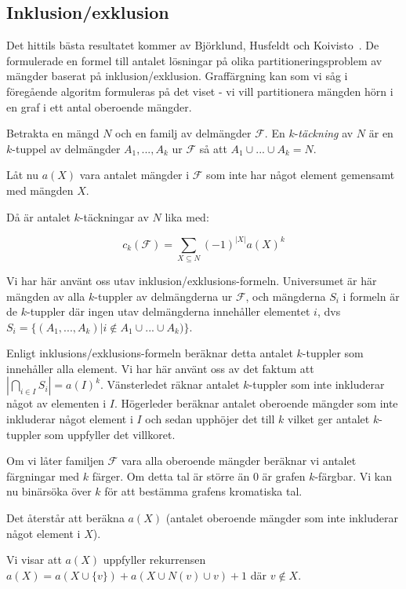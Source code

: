 \documentclass[a4paper]{report}
\begin{document}
\subsection{Inklusion/exklusion}

Det hittils bästa resultatet kommer av Björklund, Husfeldt och Koivisto~\cite{Bjorklund:2009}. De formulerade en formel till antalet lösningar på olika partitioneringsproblem av mängder baserat på inklusion/exklusion. Graffärgning kan som vi såg i föregående algoritm formuleras på det viset - vi vill partitionera mängden hörn i en graf i ett antal oberoende mängder.

Betrakta en mängd $N$ och en familj av delmängder $\mathcal{F}$. En $k$-\emph{täckning} av $N$ är en $k$-tuppel av delmängder $A_1, ..., A_k$ ur $\mathcal{F}$ så att $A_1 \cup ... \cup A_k = N$.

Låt nu $a(X)$ vara antalet mängder i $\mathcal{F}$ som inte har något element gemensamt med mängden $X$.

Då är antalet $k$-täckningar av $N$ lika med:

$$c_k(\mathcal{F}) = \sum_{X\subseteq N}{(-1)^{|X|}a(X)^k}$$

Vi har här använt oss utav inklusion/exklusions-formeln. Universumet är här mängden av alla $k$-tuppler av delmängderna ur $\mathcal{F}$, och mängderna $S_i$ i formeln är de $k$-tuppler
där ingen utav delmängderna innehåller elementet $i$, dvs $S_i = \{(A_1, ..., A_k) | i \not\in A_1 \cup ... \cup A_k)\}$.

Enligt inklusions/exklusions-formeln beräknar detta antalet $k$-tuppler som innehåller alla element. Vi har här använt oss av det faktum att $|\bigcap_{i\in I} S_i| = a(I)^k$. Vänsterledet räknar antalet $k$-tuppler som inte inkluderar något av elementen i $I$. Högerleder beräknar antalet oberoende mängder som inte
inkluderar något element i $I$ och sedan upphöjer det till $k$ vilket ger antalet $k$-tuppler som uppfyller det villkoret.

Om vi låter familjen $\mathcal{F}$ vara alla  oberoende mängder beräknar vi antalet färgningar med $k$ färger. Om detta tal är större än 0 är grafen $k$-färgbar. Vi kan
nu binärsöka över $k$ för att bestämma grafens kromatiska tal.

Det återstår att beräkna $a(X)$ (antalet oberoende mängder som inte inkluderar något element i $X$).

Vi visar att $a(X)$ uppfyller rekurrensen $a(X) = a(X \cup \{v\}) + a(X \cup N(v) \cup v) + 1$ där $v \not\in X$.
\end{document}
